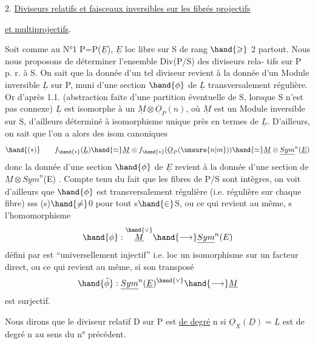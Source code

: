 
2. \uline{Diviseurs relatifs et faisceaux inversibles sur les fibrés projectifs}

\uline{et multiprojectifs}.

 Soit comme au N°1 P=P($\underline{E}$), $\underline{E}$ loc libre sur S de rang $\hand{\geqslant}$ 2 partout.
Nous nous proposons de déterminer l'ensemble Div(P/S) des diviseurs rela-%
tifs  sur P p. r. à S. On sait que la donnée d'un tel diviseur revient à la
donnée d'un Module inversible $\underline{L}$ sur P, muni d'une section $\hand{\phi}$ de $\underline{L}$
transversalement régulière. Or d'après 1.1. (abstraction faite d'une
partition éventuelle de S, lorsque S n'est pas connexe) $\underline{L}$ est isomorphe
à un $\underline{M}\otimes\underline{O}_P(n)$, où $\underline{M}$ est un Module inversible sur S, d'ailleurs déterminé
à isomorphisme unique près en termes de $\underline{L}$. D'ailleurs, on sait que
l'on a alors des isom canoniques
\[ \hand{(*)} \qquad f_{\hand{*}}(\underline{L}) \hand{\simeq} \underline{M}\otimes f_{\hand{*}}(\underline{O}_P(\unsure{n|m})) \hand{\simeq} \underline{M}\otimes\underline{Sym}^n(\underline{E}) \]
donc la donnée d'une section  $\hand{\phi}$ de $\underline{E}$ revient à la donnée d'une section
 de $\underline{M}\otimes\underline{Sym}^n$(E) . Compte tenu du fait que les fibres de P/S sont intègres,
on voit d'ailleurs que $\hand{\phi}$ est transversalement régulière (i.e. régulière
sur chaque fibre) sss \hand{$\phi$}(s)$\hand{\neq}$0 pour tout s$\hand{\in}$S, ou ce qui revient au même,
s l'homomorphisme
\[ \hand{\phi} : \overset{\hand{\vee}}{\underline{M}} \hand{\longrightarrow} \underline{Sym}^n(E) \]
défini par \hand{$\phi$} est ``universellement injectif'' i.e. loc un isomorphisme sur
un facteur direct, ou ce qui revient au même, si son transposé
\[ \hand{\check{\phi}} : \underline{Sym}^n(\underline{E})^{\hand{\vee}} \hand{\longrightarrow} \underline{M} \]
est surjectif.

Nous dirons que le diviseur relatif D sur P est \uline{de degré} n
si $\underline{O}_X(\underline{D})= \underline{L}$ est de degré n au sens du n° précédent. 

